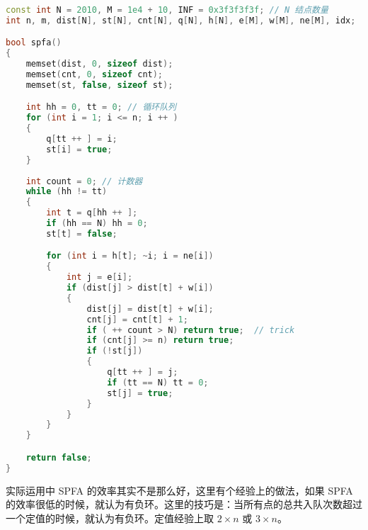 \begin{lstlisting}[language=cpp]
const int N = 2010, M = 1e4 + 10, INF = 0x3f3f3f3f; // N 结点数量
int n, m, dist[N], st[N], cnt[N], q[N], h[N], e[M], w[M], ne[M], idx;

bool spfa()
{
    memset(dist, 0, sizeof dist);
    memset(cnt, 0, sizeof cnt);
    memset(st, false, sizeof st);

    int hh = 0, tt = 0; // 循环队列
    for (int i = 1; i <= n; i ++ )
    {
        q[tt ++ ] = i;
        st[i] = true;
    }
    
    int count = 0; // 计数器
    while (hh != tt)
    {
        int t = q[hh ++ ];
        if (hh == N) hh = 0;
        st[t] = false;

        for (int i = h[t]; ~i; i = ne[i])
        {
            int j = e[i];
            if (dist[j] > dist[t] + w[i])
            {
                dist[j] = dist[t] + w[i];
                cnt[j] = cnt[t] + 1;
                if ( ++ count > N) return true;  // trick
                if (cnt[j] >= n) return true;
                if (!st[j])
                {
                    q[tt ++ ] = j;
                    if (tt == N) tt = 0;    
                    st[j] = true;
                }
            }
        }
    }

    return false;
}
\end{lstlisting}

实际运用中 SPFA 的效率其实不是那么好，这里有个经验上的做法，如果 SPFA 的效率很低的时候，就认为有负环。这里的技巧是：当所有点的总共入队次数超过一个定值的时候，就认为有负环。定值经验上取 $2 \times n$ 或 $3 \times n$。